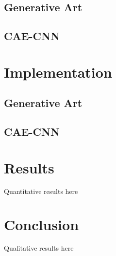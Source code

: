 \documentclass[midd]{thesis}
\begin{document}
\section{Generative Art}

\section{CAE-CNN}

\chapter{Implementation}

\section{Generative Art}

\section{CAE-CNN}

\chapter{Results}

Quantitative results here

\chapter{Conclusion}

Qualitative results here



\cite{takagi, galanter-1, galanter-2, galanter-3}
\end{document}
